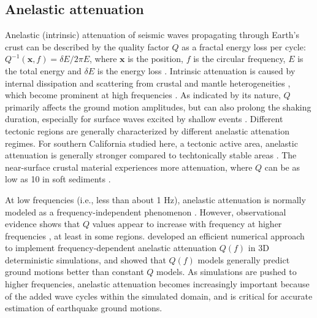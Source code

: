 \subsection{Anelastic attenuation}

Anelastic (intrinsic) attenuation of seismic waves propagating through Earth's crust can be described by the quality factor $Q$ as a fractal energy loss per cycle: $Q^{-1}(\textbf{x}, f) = \delta E / 2\pi E$, where $\textbf{x}$ is the position, $f$ is the circular frequency, $E$ is the total energy and $\delta E$ is the energy loss \citep{oconnellMeasuresDissipationViscoelastic1978}. Intrinsic attenuation is caused by internal dissipation and scattering from crustal and mantle heterogeneities \citep{satoSeismicWavePropagation2009}, which become prominent at high frequencies \citep[$f \geqslant  1$ Hz; e.g., ][]{sato2012seismic}. As indicated by its nature, $Q$ primarily affects the ground motion amplitudes, but can also prolong the shaking duration, especially for surface waves excited by shallow events \citep{imperatoriRoleTopographyLateral2015, laiShallowBasinStructure2020}. Different tectonic regions are generally characterized by different anelastic attenation regimes. For southern California studied here, a tectonic active area, anelastic attenuation is generally stronger compared to techtonically stable areas \citep{frankelAttenuationHighfrequencyShear1990,ericksonFrequencyDependentLgContinental2004}. The near-surface crustal material experiences more attenuation, where $Q$ can be as low as 10 in soft sediments \citep{asterHighfrequencyBoreholeSeismograms1991,abercrombieNearsurfaceAttenuationSite1997}.

At low frequencies (i.e., less than about 1 Hz), anelastic attenuation is normally modeled as a frequency-independent phenomenon \citep{akiQuantitativeSeismology2002}. However, observational evidence shows that $Q$ values appear to increase with frequency at higher frequencies , at least in some regions. \citet{withersMemoryEfficientSimulation2015} developed an efficient numerical approach to implement frequency-dependent anelastic attenuation $Q(f)$ in 3D deterministic simulations, and showed that $Q(f)$ models generally predict ground motions better than constant $Q$ models. As simulations are pushed to higher frequencies, anelastic attenuation becomes increasingly important because of the added wave cycles within the simulated domain, and is critical for accurate estimation of earthquake ground motions.

